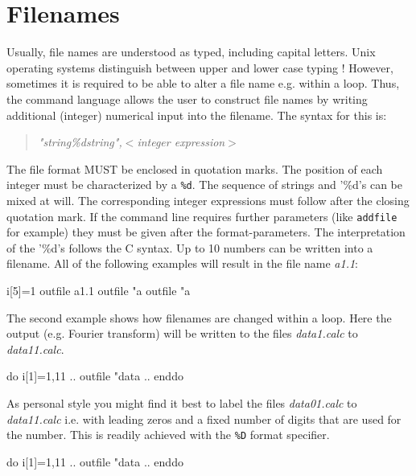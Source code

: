 
\section{Filenames \label{fnames}}

Usually, file names are understood as typed, including capital
letters. Unix operating systems distinguish between upper and lower
case typing ! However, sometimes it is required to be able to alter
a file name e.g. within a loop.  Thus, the command language allows the 
user to construct file names by writing additional (integer) numerical
input into the filename.  The syntax for this is:

\begin{quote}
  {\it "string\%dstring",$<$integer expression$>$}
\end{quote}

The file format MUST be enclosed in quotation marks.  The position
of each integer must be characterized by a {\tt \%d}.  The sequence
of strings and '\%d's can be mixed at will.  The corresponding
integer expressions must follow after the closing quotation mark. If
the command line requires further parameters (like {\tt addfile} for
example) they must be given after the format-parameters.  The
interpretation of the '\%d's follows the C syntax. Up to 10 numbers
can be written into a filename.  All of the following examples will
result in the file name {\it a1.1}:

\begin{MacVerbatim}
     i[5]=1
     outfile a1.1
     outfile "a%
     outfile "a%
\end{MacVerbatim}

The second example shows how filenames are changed within a loop.
Here the output (e.g. Fourier transform) will be written to the
files {\it data1.calc} to {\it data11.calc}.

\begin{MacVerbatim}
     do i[1]=1,11
       ..
       outfile "data%
       ..
     enddo
\end{MacVerbatim}

As personal style you might find it best to label the files 
{\it data01.calc} to {\it data11.calc} i.e. with leading zeros 
and a fixed number of digits that are used for the number.
This is readily achieved with the {\tt \%D} format specifier.

\begin{MacVerbatim}
     do i[1]=1,11
       ..
       outfile "data%
       ..
     enddo
\end{MacVerbatim}

